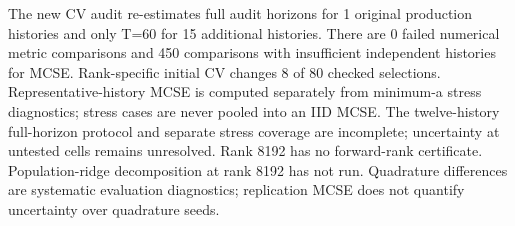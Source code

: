 The new CV audit re-estimates full audit horizons for 1 original production histories and only T=60 for 15 additional histories. There are 0 failed numerical metric comparisons and 450 comparisons with insufficient independent histories for MCSE. Rank-specific initial CV changes 8 of 80 checked selections. Representative-history MCSE is computed separately from minimum-a stress diagnostics; stress cases are never pooled into an IID MCSE. The twelve-history full-horizon protocol and separate stress coverage are incomplete; uncertainty at untested cells remains unresolved. Rank 8192 has no forward-rank certificate. Population-ridge decomposition at rank 8192 has not run. Quadrature differences are systematic evaluation diagnostics; replication MCSE does not quantify uncertainty over quadrature seeds.\begin{table}[htbp]\centering\scriptsize
\caption{Paired rank8192 minus4096 endpoint changes on the recovered audit histories. A holds the archived constant fixed; B reselects once on the initial60 at each rank. These are point differences. Where n=1 a replication MCSE is not estimable; the complete representative/stress endpoint audit remains unresolved.}
\resizebox{\textwidth}{!}{}
\end{table}

